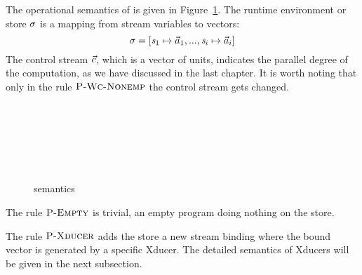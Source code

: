 The operational semantics of \fmsvcode is given in Figure~\ref{fig-svcode-semantics}.
The runtime environment or store $\sigma$ is a mapping from stream variables to vectors:
$$\sgm = [\s_1 \|-> {\a_1},...,\s_i \|-> {\a_i}]$$
The control stream $\vec c$, which is a vector of units, indicates the parallel degree of the computation, as we have discussed in the last chapter. 
It is worth noting that only in the rule $\textsc{P-Wc-Nonemp}$ the control stream gets changed.


\begin{figure}[H]\large 
	
	\\
	
	
	 \\[2ex]
	
	 \\[4ex]
	
	\\[2ex]
	\\[4ex]
	
	
	\caption{\fmsvcode semantics}
	\label{fig-svcode-semantics}
\end{figure}

The rule $\textsc{P-Empty}$ is trivial, an empty program doing nothing on the store. 

The rule $\textsc{P-Xducer}$ adds the store a new stream binding where the bound vector is generated by a specific Xducer. The detailed semantics of Xducers will be given in the next subsection. 


